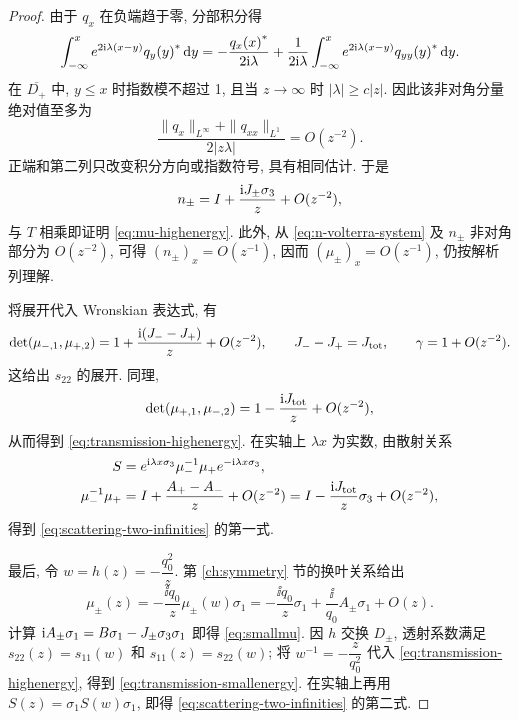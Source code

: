 \begin{proof}
由于 $q_x$ 在负端趋于零, 分部积分得
\begin{equation*}
\int_{-\infty}^{x}e^{2\mathrm{i}\lambda(x-y)}{q_y(y)}^{*}\,\mathrm{d} y
=-\dfrac{{q_x(x)}^{*}}{2\mathrm{i}\lambda}
+\dfrac{1}{2\mathrm{i}\lambda}\int_{-\infty}^{x}e^{2\mathrm{i}\lambda(x-y)}{q_{yy}(y)}^{*}\,\mathrm{d} y.
\end{equation*}
在 $\overline{D_+}$ 中, $y\le x$ 时指数模不超过 1, 且当 $z\to\infty$ 时 $|\lambda|\ge c|z|$. 因此该非对角分量绝对值至多为
\begin{equation*}
\dfrac{\|q_x\|_{L^\infty}+\|q_{xx}\|_{L^1}}{2|z\lambda|}=O(z^{-2}).
\end{equation*}
正端和第二列只改变积分方向或指数符号, 具有相同估计. 于是
\begin{equation*}
n_\pm=I+\dfrac{\mathrm{i} J_\pm\sigma_3}{z}+O(z^{-2}),
\end{equation*}
与 $ T$ 相乘即证明 \eqref{eq:mu-highenergy}. 此外, 从 \eqref{eq:n-volterra-system} 及 $n_\pm$ 非对角部分为 $O(z^{-2})$, 可得 $(n_\pm)_x=O(z^{-1})$, 因而 $(\mu_\pm)_x=O(z^{-1})$, 仍按解析列理解.

将展开代入 Wronskian 表达式, 有
\begin{equation*}
\det(\mu_{-,1},\mu_{+,2})
=1+\dfrac{\mathrm{i}(J_--J_+)}{z}+O(z^{-2}),\qquad
J_--J_+=J_{\rm tot},\qquad \gamma=1+O(z^{-2}).
\end{equation*}
这给出 $s_{22}$ 的展开. 同理,
\begin{equation*}
\det(\mu_{+,1},\mu_{-,2})
=1-\dfrac{\mathrm{i} J_{\rm tot}}{z}+O(z^{-2}),
\end{equation*}
从而得到 \eqref{eq:transmission-highenergy}. 在实轴上 $\lambda x$ 为实数, 由散射关系
\begin{equation*}
\begin{aligned}
S&=e^{\mathrm{i}\lambda x\sigma_3}\mu_-^{-1}\mu_+e^{-\mathrm{i}\lambda x\sigma_3},\\
\mu_-^{-1}\mu_+&=I+\dfrac{A_+-A_-}{z}+O(z^{-2})
=I-\dfrac{\mathrm{i} J_{\rm tot}}{z}\sigma_3+O(z^{-2}),
\end{aligned}
\end{equation*}
得到 \eqref{eq:scattering-two-infinities} 的第一式.

最后, 令 $w=h(z)=-\dfrac{q_0^2}{z}$. 第 \ref{ch:symmetry} 节的换叶关系给出
\begin{equation*}
\mu_\pm(z)=-\dfrac{\ii q_0}{z}\mu_\pm(w)\sigma_1
=-\dfrac{\ii q_0}{z}\sigma_1+\dfrac{\ii}{q_0}A_\pm\sigma_1+O(z).
\end{equation*}
计算 $\mathrm{i} A_\pm\sigma_1=B\sigma_1-J_\pm\sigma_3\sigma_1$ 即得 \eqref{eq:smallmu}. 因 $h$ 交换 $D_\pm$, 透射系数满足 $s_{22}(z)=s_{11}(w)$ 和 $s_{11}(z)=s_{22}(w)$; 将 $w^{-1}=-\dfrac{z}{q_0^2}$ 代入 \eqref{eq:transmission-highenergy}, 得到 \eqref{eq:transmission-smallenergy}. 在实轴上再用 $S(z)=\sigma_1S(w)\sigma_1$, 即得 \eqref{eq:scattering-two-infinities} 的第二式.
\end{proof}

